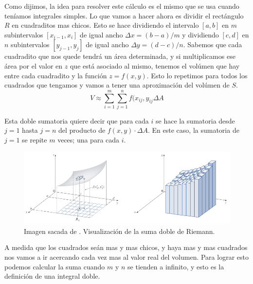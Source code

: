 \documentclass[12pt]{article}
\begin{document}
Como dijimos, la idea para resolver este cálculo es el mismo que se usa cuando teníamos integrales simples. Lo que vamos a hacer ahora es dividir el rectángulo $ R $ en cuadraditos mas chicos. Esto se hace dividiendo el intervalo $ \left[a,b\right] $ en $ m $ subintervalos $ \left[x_{i-1},x_{i}\right] $ de igual ancho $ \Delta x=(b-a)/m $ y dividiendo $ \left[c,d\right] $ en $ n $ subintervalos $ \left[y_{j-1},y_{j}\right] $ de igual ancho $ \Delta y=(d-c)/n $. Sabemos que cada cuadradito que nos quede tendrá un área determinada, y si multiplicamos ese área por el valor en $ z $ que está asociado al mismo, tenemos el volúmen que hay entre cada cuadradito y la función $ z=f(x,y) $. Esto lo repetimos para todos los cuadrados que tengamos y vamos a tener una aproximación del volúmen de $ S $. 
\[
  V\approx \sum_{i=1}^{m} \sum_{j=1}^{n} f(x_{ij},y_{ij}\Delta A  
\]

Esta doble sumatoria quiere decir que para cada $ i $ se hace la sumatoria desde $ j=1 $ hasta $ j=n $ del producto de $ f(x,y)\cdot \Delta A $. En este caso, la sumatoria de $ j=1 $ se repite $ m $ veces; una para cada $ i $.

\begin{figure}[H]
  \centering
  \includegraphics[width=\linewidth]{imagenes/vol-integrado-2.png}
  \caption{Imagen sacada de \parencite{stewart2}. Visualización de la suma doble de Riemann.}
  \label{fig:integrales-2}
\end{figure}

A medida que los cuadrados seán mas y mas chicos, y haya mas y mas cuadrados nos vamos a ir acercando cada vez mas al valor real del volumen. Para lograr esto podemos calcular la suma cuando $ m $ y $ n $ se tienden a infinito, y esto es la definición de una integral doble.

\vspace{0.2cm}
\vspace{0.2cm}
\end{document}
